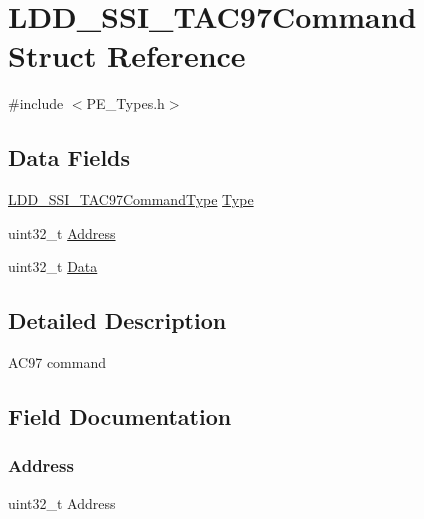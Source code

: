 \hypertarget{struct_l_d_d___s_s_i___t_a_c97_command}{}\section{L\+D\+D\+\_\+\+S\+S\+I\+\_\+\+T\+A\+C97\+Command Struct Reference}
\label{struct_l_d_d___s_s_i___t_a_c97_command}


{\ttfamily \#include $<$P\+E\+\_\+\+Types.\+h$>$}

\subsection*{Data Fields}
\begin{DoxyCompactItemize}
\item 
\hyperlink{group___p_e___types__module_gac7398329f7fdf5c8834b026e63f5edc2}{L\+D\+D\+\_\+\+S\+S\+I\+\_\+\+T\+A\+C97\+Command\+Type} \hyperlink{struct_l_d_d___s_s_i___t_a_c97_command_aa982cc924bb2becfceec68de33b9aeb5}{Type}
\item 
uint32\+\_\+t \hyperlink{struct_l_d_d___s_s_i___t_a_c97_command_aca1b23fd721c8d8dc70a8227e336b6e8}{Address}
\item 
uint32\+\_\+t \hyperlink{struct_l_d_d___s_s_i___t_a_c97_command_a6f3335509cc4943e20df66f72483910c}{Data}
\end{DoxyCompactItemize}


\subsection{Detailed Description}
A\+C97 command 

\subsection{Field Documentation}
\mbox{\label{struct_l_d_d___s_s_i___t_a_c97_command_aca1b23fd721c8d8dc70a8227e336b6e8}} 
\subsubsection{\texorpdfstring{Address}{Address}}
{\footnotesize\ttfamily uint32\+\_\+t Address}

